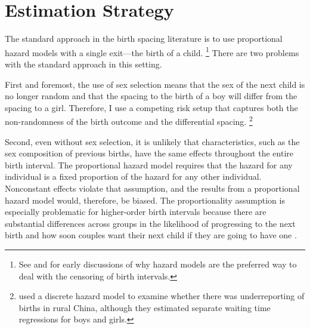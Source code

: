 \documentclass[12pt,letterpaper]{article}
\begin{document}
\section{Estimation Strategy\label{sec:strategy}}


The standard approach in the birth spacing literature is to use proportional hazard
models with a single exit---the birth of a child.%
\footnote{
See \citet{Sheps1970} and \citet{Newman1984} for early discussions of why 
hazard models are the preferred way to deal with the censoring of birth
intervals.
}
There are two problems with the standard approach in this setting.

First and foremost, the use of sex selection means that the sex of the next child is 
no longer random and that the spacing to the birth of a boy will differ from the 
spacing to a girl. 
Therefore, I use a competing risk setup that captures both the non-randomness of 
the birth outcome and the differential spacing.%
\footnote{
\cite{Merli2000} used a discrete hazard model to examine whether 
there was underreporting of births in rural China, although they 
estimated separate waiting time regressions for boys and girls.
}

Second, even without sex selection, it is unlikely that characteristics, such as 
the sex composition of previous births, have the same effects throughout the entire 
birth interval. 
The proportional hazard model requires that the hazard for any individual is a 
fixed proportion of the hazard for any other individual. 
Nonconstant effects violate that assumption, and the results from a proportional hazard 
model would, therefore, be biased. 
The proportionality assumption is especially problematic for higher-order birth 
intervals because there are substantial differences across groups in the likelihood 
of progressing to the next birth and how soon couples want their next child if they 
are going to have one \citep{Whitworth2002,Bhalotra2008,Kim2010}.
\end{document}
